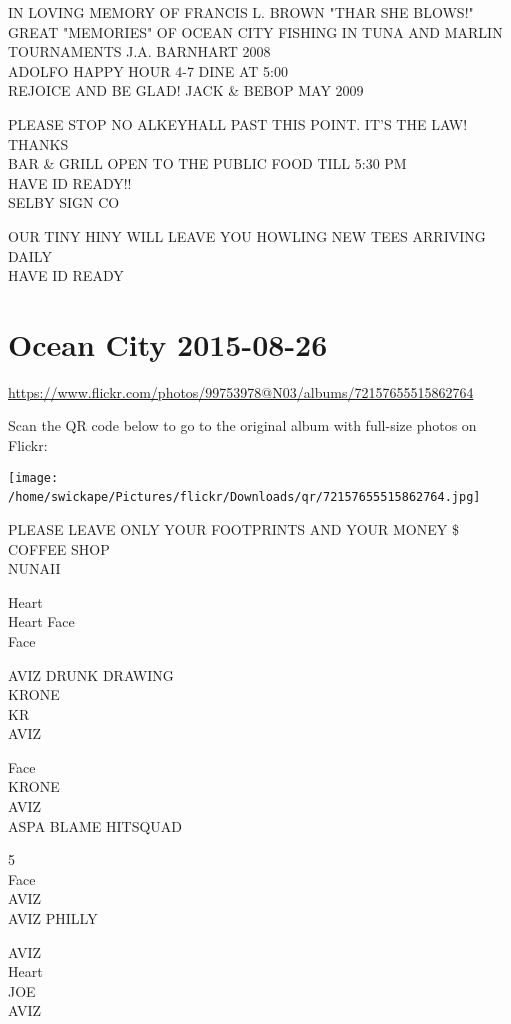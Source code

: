 \documentclass[10pt,letterpaper]{article}
\begin{document}
IN LOVING MEMORY OF FRANCIS L. BROWN "THAR SHE BLOWS!"\\
GREAT "MEMORIES" OF OCEAN CITY FISHING IN TUNA AND MARLIN TOURNAMENTS J.A. BARNHART 2008\\
ADOLFO HAPPY HOUR 4{-}7 DINE AT 5:00\\
REJOICE AND BE GLAD!  JACK \& BEBOP MAY 2009

PLEASE STOP NO ALKEYHALL PAST THIS POINT.  IT'S THE LAW!  THANKS\\
BAR \& GRILL OPEN TO THE PUBLIC FOOD TILL 5:30 PM\\
HAVE ID READY!!\\
SELBY SIGN CO

OUR TINY HINY WILL LEAVE YOU HOWLING NEW TEES ARRIVING DAILY\\
HAVE ID READY
\

\section*{Ocean City 2015-08-26}

\url{https://www.flickr.com/photos/99753978@N03/albums/72157655515862764}

Scan the QR code below to go to the original album with full-size photos on Flickr:

\texttt{[image: /home/swickape/Pictures/flickr/Downloads/qr/72157655515862764.jpg]}
\

PLEASE LEAVE ONLY YOUR FOOTPRINTS AND YOUR MONEY \$\\
COFFEE SHOP\\
NUNAII

Heart\\
Heart Face\\
Face

AVIZ DRUNK DRAWING\\
KRONE\\
KR\\
AVIZ

Face\\
KRONE\\
AVIZ\\
ASPA BLAME HITSQUAD

5\\
Face\\
AVIZ\\
AVIZ PHILLY

AVIZ\\
Heart\\
JOE\\
AVIZ
\end{document}
